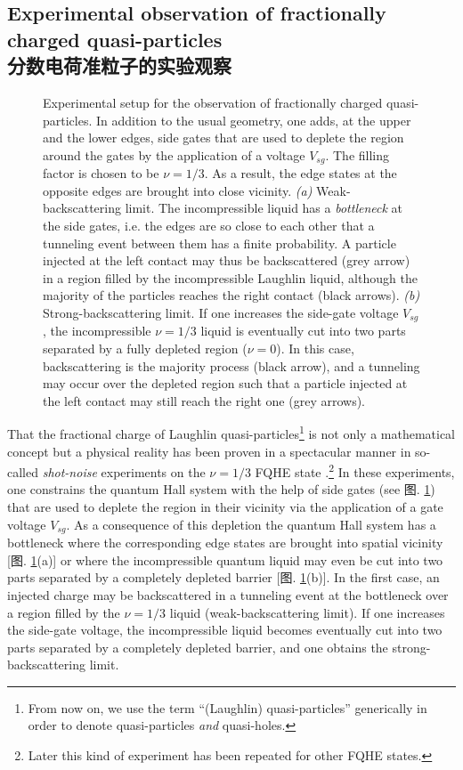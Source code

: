 \documentclass[10pt]{book}
\begin{document}
\subsection[分数电荷准粒子的实验观察]{Experimental observation of fractionally charged quasi-particles\\\bf 分数电荷准粒子的实验观察}


\begin{figure}
\begin{center}
\end{center}
\caption{ Experimental setup for the observation of fractionally charged quasi-particles. In addition to the usual geometry,
one adds, at the upper and the lower edges, side gates that are used to deplete the region around the gates
by the application of a voltage $V_{sg}$. The filling
factor is chosen to be $\nu=1/3$. As a result,
the edge states at the opposite edges are brought into close vicinity. {\sl (a)} Weak-backscattering limit.
The incompressible liquid has a {\sl bottleneck}
at the side gates, i.e. the edges are so close to each other that a tunneling event between them has a finite probability. A particle
injected at the left contact may thus be backscattered (grey arrow) in a region filled by the incompressible Laughlin liquid, although
the majority of the particles reaches the right contact (black arrows).
{\sl (b)} Strong-backscattering limit.
If one increases the side-gate voltage $V_{sg}$, the 
incompressible $\nu=1/3$ liquid is eventually cut into two parts separated by a fully depleted region ($\nu=0$). In this case,
backscattering is the majority process (black arrow), 
and a tunneling may occur over the depleted region such that a particle injected at the 
left contact may still reach the right one (grey arrows).}
\label{fig21}
\end{figure}

That the fractional charge of Laughlin quasi-particles\footnote{From now on, we use the term ``(Laughlin) quasi-particles'' generically 
in order to denote quasi-particles {\sl and} quasi-holes.}
is not only a mathematical concept but a physical reality has been proven in a spectacular manner in so-called {\sl shot-noise}
experiments on the $\nu=1/3$ FQHE state \cite{SN1,SN2}.\footnote{Later this kind of experiment has been repeated for other FQHE states.}
In these experiments, one constrains the quantum Hall system with the help of side gates (see 图. \ref{fig21}) that are used to deplete
the region in their vicinity via the application of a gate voltage $V_{sg}$. As a consequence of this depletion the quantum Hall 
system has a bottleneck where the corresponding edge states are brought into spatial vicinity [图. \ref{fig21}(a)]
or where the incompressible quantum liquid may even be cut into two parts separated by a completely depleted barrier 
[图. \ref{fig21}(b)]. In the first case, an injected charge may be backscattered in a tunneling event at the bottleneck over a 
region filled by the $\nu=1/3$ liquid (weak-backscattering limit).  If one increases the side-gate voltage, the incompressible
liquid becomes eventually cut into two parts separated by a completely depleted barrier, and one obtains the strong-backscattering
limit.
\end{document}
